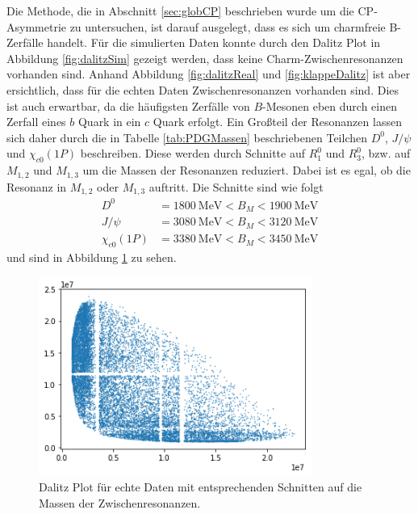 Die Methode, die in Abschnitt \ref{sec:globCP} beschrieben wurde um die CP-Asymmetrie zu untersuchen, ist darauf ausgelegt, dass es sich um charmfreie B-Zerfälle handelt.
Für die simulierten Daten konnte durch den Dalitz Plot in Abbildung \ref{fig:dalitzSim} gezeigt werden, dass keine Charm-Zwischenresonanzen vorhanden sind.
Anhand Abbildung \ref{fig:dalitzReal} und \ref{fig:klappeDalitz} ist aber ersichtlich, dass für die echten Daten Zwischenresonanzen vorhanden sind.
Dies ist auch erwartbar, da die häufigsten Zerfälle von $B$-Mesonen eben durch einen Zerfall eines $b$ Quark in ein $c$ Quark erfolgt.
Ein Großteil der Resonanzen lassen sich daher durch die in Tabelle \ref{tab:PDGMassen} beschriebenen Teilchen $D^0$, $J/\psi$ und $\chi_{c0}\left(1P\right)$ beschreiben.
Diese werden durch Schnitte auf $R_1^0$ und $R_3^0$, bzw. auf $M_{1,2}$ und $M_{1,3}$ um die Massen der Resonanzen reduziert.
Dabei ist es egal, ob die Resonanz in $M_{1,2}$ oder $M_{1,3}$ auftritt.
Die Schnitte sind wie folgt
\begin{align*}
  D^0 &= \SI{1800}{\mega\electronvolt} < B_M < \SI{1900}{\mega\electronvolt}  \\
  J/\psi &= \SI{3080}{\mega\electronvolt} < B_M < \SI{3120}{\mega\electronvolt} \\
  \chi_{c0}\left(1P\right) &= \SI{3380}{\mega\electronvolt} < B_M < \SI{3450}{\mega\electronvolt}
\end{align*}
und sind in Abbildung \ref{fig:schnibbelDalitz} zu sehen.

\begin{figure}
  \centering
  \includegraphics[width=0.8\textwidth]{plots/real_data_dalitz_removed_resonances.png}
  \caption{Dalitz Plot für echte Daten mit entsprechenden Schnitten auf die Massen der Zwischenresonanzen.}
  \label{fig:schnibbelDalitz}
\end{figure}

